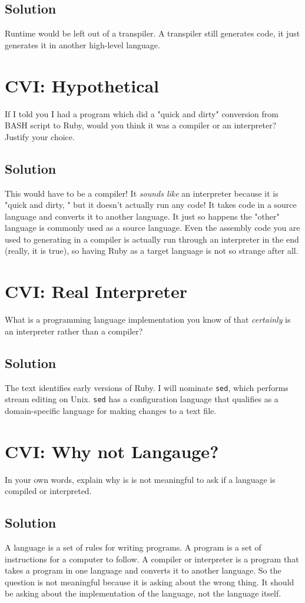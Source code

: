 \documentclass[twoside=false, DIV=14]{scrartcl}
\begin{document}
\subsection*{Solution}
Runtime would be left out of a transpiler.  A transpiler still generates code, it just generates it in another high-level language.

\section*{CVI: Hypothetical}
  If I told you I had a program which did a "quick and dirty" conversion from BASH script to Ruby, would you think it was a compiler or an interpreter?  Justify your choice.
  \subsection*{Solution}
  This would have to be a compiler! It \emph{sounds like} an interpreter because it is "quick and dirty, " but it doesn't actually run any code! It takes code in a source language and converts it to another language. It just so happens the "other" language is commonly used as a source language. Even the assembly code you are used to generating in a compiler is actually run through an interpreter in the end (really, it is true), so having Ruby as a target language is not so strange after all.

\section*{CVI: Real Interpreter}
What is a programming language implementation you know of that \emph{certainly} is an interpreter rather than a compiler?

  \subsection*{Solution}
  The text identifies early versions of Ruby. I will nominate \texttt{sed}, which performs stream editing on Unix. \texttt{sed} has a configuration language that qualifies as a domain-specific language for making changes to a text file.

\section*{CVI: Why not Langauge?}
In your own words, explain why is is not meaningful to ask if a language is compiled or interpreted.

\subsection*{Solution}
A language is a set of rules for writing programs.  A program is a set of instructions for a computer to follow.  A compiler or interpreter is a program that takes a program in one language and converts it to another language.  So the question is not meaningful because it is asking about the wrong thing.  It should be asking about the implementation of the language, not the language itself.  
\end{document}
